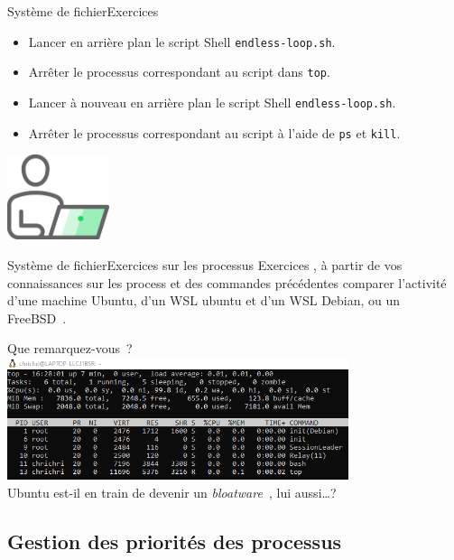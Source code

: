 \documentclass{beamer}
\begin{document}
    \begin{frame}{Système de fichier}{Exercices \execcounterdispinc{}}
        \begin{itemize}
            \item Lancer en arrière plan le script Shell \lstinline{endless-loop.sh}.
            \item Arrêter le processus correspondant au script dans \lstinline{top}.
            \item Lancer à nouveau en arrière plan le script Shell \lstinline{endless-loop.sh}.
            \item Arrêter le processus correspondant au script à l'aide de  \lstinline{ps} et \lstinline{kill}.
        \end{itemize}
        \bigbreak
        \centering
        \includegraphics[width=3cm]{image/guy-in-front-of-desktop}
    \end{frame}

    \begin{frame}{Système de fichier}{Exercices sur les processus}
        Exercices \execcounterdispinc{}, à partir de vos connaissances sur les process et des commandes précédentes comparer l'activité d'une machine Ubuntu, d'un WSL ubuntu et d'un WSL Debian, ou un FreeBSD~.

        Que remarquez-vous~?
        \pause
        \bigbreak
        \centering
        \includegraphics[width=10cm]{image/top-debian} \\ Ubuntu est-il en train de devenir un \textit{bloatware~}, lui aussi\ldots {}?
    \end{frame}

    \subsection{Gestion des priorités des processus}\label{subsec:process-priority}
\end{document}
